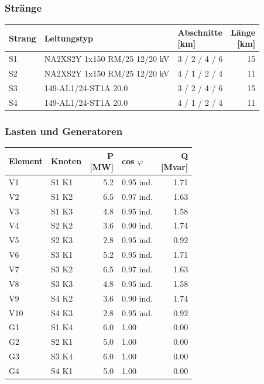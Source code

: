 \documentclass[11pt,a4paper]{article}
\begin{document}
\subsubsection{Stränge}

\begin{table}[H]
\centering
\begin{adjustbox}{max width=\linewidth}
\begin{tabular}{lllr}
\toprule
\textbf{Strang} & \textbf{Leitungstyp} & \thead{Abschnitte \\ {[km]}} & \thead{Länge \\ {[km]}} \\
\midrule
S1 & NA2XS2Y 1x150 RM/25 12/20 kV & 3 / 2 / 4 / 6 & 15 \\
S2 & NA2XS2Y 1x150 RM/25 12/20 kV & 4 / 1 / 2 / 4 & 11 \\
S3 & 149-AL1/24-ST1A 20.0 & 3 / 2 / 4 / 6 & 15 \\
S4 & 149-AL1/24-ST1A 20.0 & 4 / 1 / 2 / 4 & 11 \\
\bottomrule
\end{tabular}
\end{adjustbox}
\end{table}

\subsubsection{Lasten und Generatoren}

\begin{table}[H]
\centering
\begin{adjustbox}{max width=\linewidth}
\begin{tabular}{llrlr}
\toprule
\textbf{Element} & \textbf{Knoten} & \thead{P \\ {[MW]}} & \textbf{cos $\varphi$} & \thead{Q \\ {[Mvar]}} \\
\midrule
V1 & S1 K1 & 5.2 & 0.95 ind. & 1.71 \\
V2 & S1 K2 & 6.5 & 0.97 ind. & 1.63 \\
V3 & S1 K3 & 4.8 & 0.95 ind. & 1.58 \\
V4 & S2 K2 & 3.6 & 0.90 ind. & 1.74 \\
V5 & S2 K3 & 2.8 & 0.95 ind. & 0.92 \\
V6 & S3 K1 & 5.2 & 0.95 ind. & 1.71 \\
V7 & S3 K2 & 6.5 & 0.97 ind. & 1.63 \\
V8 & S3 K3 & 4.8 & 0.95 ind. & 1.58 \\
V9 & S4 K2 & 3.6 & 0.90 ind. & 1.74 \\
V10 & S4 K3 & 2.8 & 0.95 ind. & 0.92 \\
G1 & S1 K4 & 6.0 & 1.00 & 0.00 \\
G2 & S2 K1 & 5.0 & 1.00 & 0.00 \\
G3 & S3 K4 & 6.0 & 1.00 & 0.00 \\
G4 & S4 K1 & 5.0 & 1.00 & 0.00 \\
\bottomrule
\end{tabular}
\end{adjustbox}
\end{table}
\end{document}
